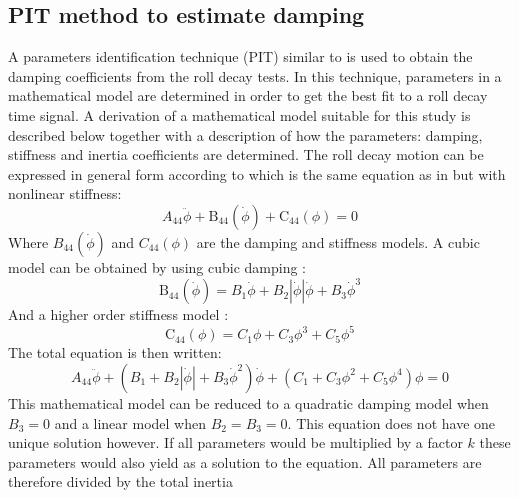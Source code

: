 \subsection*{PIT method to estimate
damping}\label{pit-method-to-estimate-damping}
\label{se:pit}
A parameters identification technique (PIT) similar to
\citep{7505983/EXYJELCU} is used to obtain the damping coefficients from
the roll decay tests. In this technique, parameters in a mathematical
model are determined in order to get the best fit to a roll decay time
signal. A derivation of a mathematical model suitable for this study is
described below together with a description of how the parameters:
damping, stiffness and inertia coefficients are determined. The roll
decay motion can be expressed in general form according to
\citep{7505983/KL7A3RIV} which is the same equation as in
\citep{7505983/FB64RGPF} but with nonlinear stiffness:
\begin{equation}
A_{44} \ddot{\phi} + \operatorname{B_{44}}{\left(\dot{\phi} \right)} + \operatorname{C_{44}}{\left(\phi \right)} = 0
\label{eq:roll_decay_equation_general_himeno}
\end{equation}
Where $B_{44}(\dot{\phi})$ and $C_{44}(\phi)$ are the damping and
stiffness models. A cubic model can be obtained by using cubic damping
\citep{7505983/FB64RGPF}:
\begin{equation}
\operatorname{B_{44}}{\left(\dot{\phi} \right)} = B_{1} \dot{\phi} + B_{2} \left|{\dot{\phi}}\right| \dot{\phi} + B_{3} \dot{\phi}^{3}
\label{eq:b44_cubic_equation}
\end{equation}
And a higher order stiffness model \citep{7505983/KL7A3RIV}:
\begin{equation}
\operatorname{C_{44}}{\left(\phi \right)} = C_{1} \phi + C_{3} \phi^{3} + C_{5} \phi^{5}
\label{eq:restoring_equation_cubic}
\end{equation}
The total equation is then written:
\begin{equation}
A_{44} \ddot{\phi} + \left(B_{1} + B_{2} \left|{\dot{\phi}}\right| + B_{3} \dot{\phi}^{2}\right) \dot{\phi} + \left(C_{1} + C_{3} \phi^{2} + C_{5} \phi^{4}\right) \phi = 0
\label{eq:roll_decay_equation_cubic}
\end{equation}
This mathematical model can be reduced to a quadratic damping model when
$B_3=0$ and a linear model when $B_2=B_3=0$. This equation does not
have one unique solution however. If all parameters would be multiplied
by a factor $k$ these parameters would also yield as a solution to the
equation. All parameters are therefore divided by the total inertia
